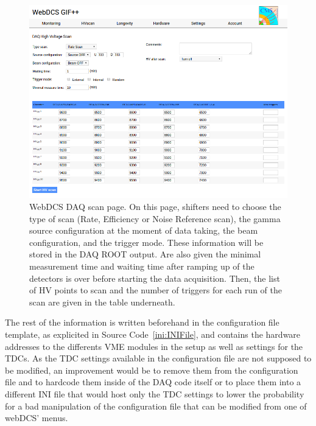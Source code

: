     \begin{figure}[H]
		\centering
		\includegraphics[width = \plotwidth]{fig/app1/webDCS-scan-information.png}
		\caption{\label{fig:scaninfo} WebDCS DAQ scan page. On this page, shifters need to choose the type of scan (Rate, Efficiency or Noise Reference scan), the gamma source configuration at the moment of data taking, the beam configuration, and the trigger mode. These information will be stored in the DAQ ROOT output. Are also given the minimal measurement time and waiting time after ramping up of the detectors is over before starting the data acquisition. Then, the list of HV points to scan and the number of triggers for each run of the scan are given in the table underneath.}
	\end{figure}
	
	The rest of the information is written beforehand in the configuration file template, as explicited in Source Code~\ref{ini:INIFile}, and contains the hardware addresses to the differents VME modules in the setup as well as settings for the TDCs. As the TDC settings available in the configuration file are not supposed to be modified, an improvement would be to remove them from the configuration file and to hardcode them inside of the DAQ code itself or to place them into a different INI file that would host only the TDC settings to lower the probability for a bad manipulation of the configuration file that can be modified from one of webDCS' menus.\\
    
